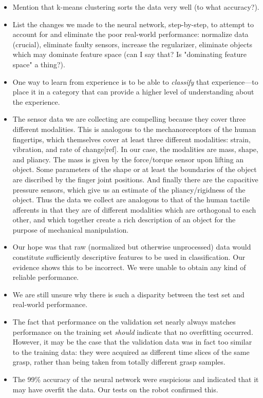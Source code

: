 \documentclass[12pt, oneside]{article}
\begin{document}
\begin{itemize}
\item Mention that k-means clustering sorts the data very well (to what accuracy?).
\item List the changes we made to the neural network, step-by-step, to attempt to account for and eliminate the poor real-world performance: normalize data (crucial), eliminate faulty sensors, increase the regularizer, eliminate objects which may dominate feature space (can I say that? Is "dominating feature space" a thing?).
\item One way to learn from experience is to be able to \emph{classify} that experience---to place it in a category that can provide a higher level of understanding about the experience.
\item The sensor data we are collecting are compelling because they cover three different modalities. This is analogous to the mechanoreceptors of the human fingertips, which themselves cover at least three different modalities: strain, vibration, and rate of change[ref]. In our case, the modalities are mass, shape, and pliancy. The mass is given by the force/torque sensor upon lifting an object. Some parameters of the shape or at least the boundaries of the object are discribed by the finger joint positions. And finally there are the capacitive pressure sensors, which give us an estimate of the pliancy/rigidness of the object. Thus the data we collect are analogous to that of the human tactile afferents in that they are of different modalities which are orthogonal to each other, and which together create a rich description of an object for the purpose of mechanical manipulation.
\item Our hope was that raw (normalized but otherwise unprocessed) data would constitute sufficiently descriptive features to be used in classification. Our evidence shows this to be incorrect. We were unable to obtain any kind of reliable performance.
\item We are still unsure why there is such a disparity between the test set and real-world performance.
\item The fact that performance on the validation set nearly always matches performance on the training set \emph{should} indicate that no overfitting occurred. However, it may be the case that the validation data was in fact too similar to the training data: they were acquired as different time slices of the same grasp, rather than being taken from totally different grasp samples.
\item The 99\% accuracy of the neural network were suspicious and indicated that it may have overfit the data. Our tests on the robot confirmed this.

\end{itemize}
\end{document}
